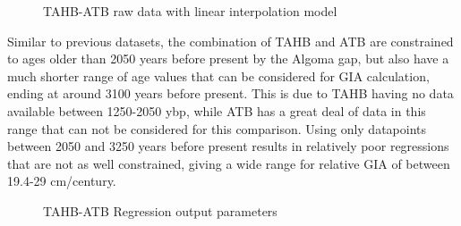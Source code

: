 \begin{figure}[h]
	\caption{TAHB-ATB raw data with linear interpolation model}
	\label{fig:data_TAHBxATB}
\end{figure}

Similar to previous datasets, the combination of TAHB and ATB are constrained to
ages older than
2050 years before present by the Algoma gap, but also have a much shorter range
of age values that
can be considered for GIA calculation, ending at around 3100 years before present.
This is due to TAHB having no data available between 1250-2050 ybp, while ATB
has a great deal of data in this range that can not be considered for this
comparison.
Using only datapoints between 2050 and 3250 years before present results in
relatively poor regressions that are not as well constrained, giving a wide range for
relative GIA of between 19.4-29 cm/century.


\begin{figure}[h]
	\begin{flushleft}
	\end{flushleft}
	\caption{TAHB-ATB Regression output parameters}
	\label{fig:TAHBxATB_regression}
\end{figure}


\newpage

